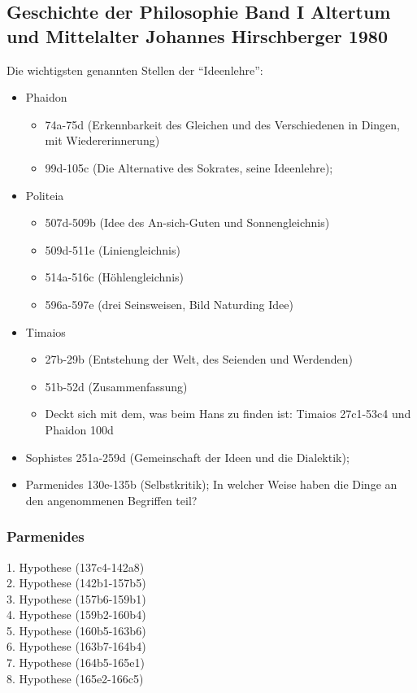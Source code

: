 \documentclass[12pt]{article}
\begin{document}
\subsection*{Geschichte der Philosophie Band I Altertum und Mittelalter Johannes Hirschberger 1980}
Die wichtigsten genannten Stellen der \enquote{Ideenlehre}:
\begin{itemize}
    \item {Phaidon
    \begin{itemize}
        \item{74a-75d (Erkennbarkeit des Gleichen und des Verschiedenen in Dingen, mit Wiedererinnerung)}
        \item{99d-105c (Die Alternative des Sokrates, seine Ideenlehre);}
    \end{itemize}}
    \item{Politeia
        \begin{itemize}
            \item{507d-509b (Idee des An-sich-Guten und Sonnengleichnis)}
            \item{509d-511e (Liniengleichnis)}
            \item{514a-516c (Höhlengleichnis)}
            \item{596a-597e (drei Seinsweisen, Bild Naturding Idee)}
        \end{itemize}}
    \item{Timaios
    \begin{itemize}
        \item{27b-29b (Entstehung der Welt, des Seienden und Werdenden)} 
        \item{51b-52d (Zusammenfassung)} 
        \item{Deckt sich mit dem, was beim Hans zu finden ist: Timaios 27c1-53c4 und Phaidon 100d}
    \end{itemize}}
    \item{Sophistes 251a-259d (Gemeinschaft der Ideen und die Dialektik);}
    \item{Parmenides 130e-135b (Selbstkritik); In welcher Weise haben die Dinge an den angenommenen Begriffen teil?}
\end{itemize}
\subsubsection*{Parmenides}
1. Hypothese (137c4-142a8)\\
2. Hypothese (142b1-157b5)\\
3. Hypothese (157b6-159b1)\\
4. Hypothese (159b2-160b4)\\
5. Hypothese (160b5-163b6)\\
6. Hypothese (163b7-164b4)\\
7. Hypothese (164b5-165e1)\\
8. Hypothese (165e2-166c5)
\end{document}
